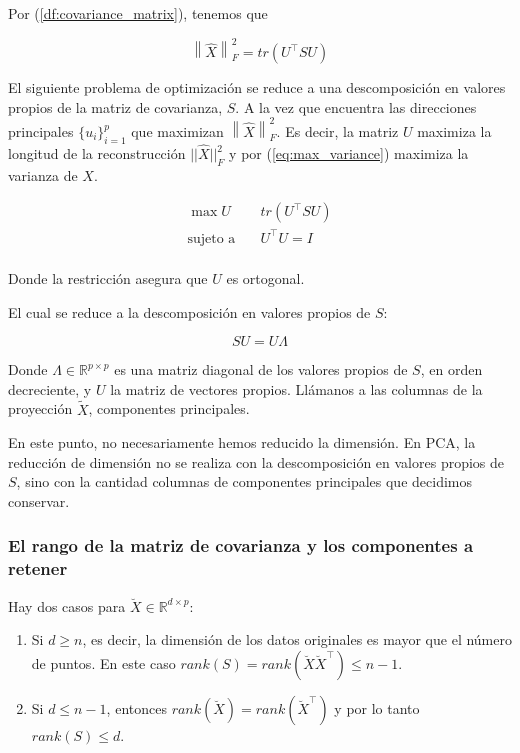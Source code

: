 \documentclass{article}
\numberwithin{equation}{section}
\theoremstyle{remark}
\theoremstyle{definition}
\theoremstyle{remark}
\theoremstyle{remark}
\begin{document}
Por (\ref{df:covariance_matrix}), tenemos que

\begin{equation}
    \label{eq:max_variance}
    \left\| \hat{X} \right\|^2_F = tr(U^\intercal S U)
\end{equation}

El siguiente problema de optimización se reduce a una descomposición en valores propios de la matriz de covarianza, $S$. 
A la vez que encuentra las direcciones principales $\{u_i\}_{i=1}^p$ que maximizan $\left\|\hat{X}\right\|_F^2$.
Es decir, la matriz $U$ maximiza la longitud de la reconstrucción $||\hat{X}||_F^2$ y por (\ref{eq:max_variance}) maximiza la varianza de $X$.


\begin{equation*}
    \label{eq:pca_optimization}
    \begin{aligned}
        \max{U} \quad & tr(U^\intercal S U) \\
        \textrm{sujeto a} \quad & U^\intercal U = I \\
    \end{aligned}
\end{equation*}

Donde la restricción asegura que $U$ es ortogonal.

El cual se reduce a la descomposición en valores propios de $S$:

\begin{equation}
    \label{eq:eigen_decomposition}
    SU = U \Lambda
\end{equation}

Donde $\Lambda \in \mathbb{R}^{p \times p}$ es una matriz diagonal de los valores propios de $S$, en orden decreciente, y $U$ la matriz de vectores propios.
Llámanos a las columnas de la proyección $\tilde{X}$, componentes principales.

En este punto, no necesariamente hemos reducido la dimensión. En PCA, la reducción de dimensión no se realiza con la descomposición 
en valores propios de $S$, sino con la cantidad columnas de componentes principales que decidimos conservar.

\subsubsection{El rango de la matriz de covarianza y los componentes a retener}
Hay dos casos para $\breve{X} \in \mathbb{R}^{d \times p}$:
\begin{enumerate}
    \item Si $d \geq n$, es decir, la dimensión de los datos originales es mayor que el número de puntos.
          En este caso $rank(S) = rank(\breve{X} \breve{X}^\intercal) \leq n - 1$.
    \item Si $d \leq n - 1$, entonces $rank(\breve{X}) = rank(\breve{X}^\intercal)$ y por lo tanto $rank(S) \leq d$.
\end{enumerate}
\end{document}
